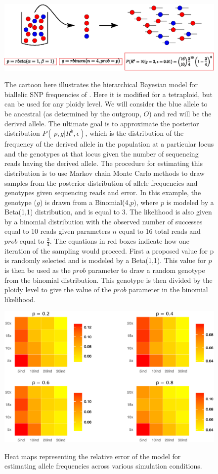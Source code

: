 \documentclass[11pt,english,letterpaper,oneside]{article}
\begin{document}
\begin{figure}[b]
\centering
\caption{The cartoon here illustrates the hierarchical Bayesian model for biallelic SNP frequencies of \cite{buerkle2013popModels}.  Here it is modified for a tetraploid, but can be used for any ploidy level. We will consider the blue allele to be ancestral (as determined by the outgroup, $O$) and red will be the derived allele. The ultimate goal is to approximate the posterior distribution $P(\,p,g|R^b,\epsilon)$, which is the distribution of the frequency of the derived allele in the population at a particular locus and the genotypes at that locus given the number of sequencing reads having the derived allele. The procedure for estimating this distribution is to use Markov chain Monte Carlo methods to draw samples from the posterior distribution of allele frequencies and genotypes given sequencing reads and error. In this example, the genotype ($g$) is drawn from a Binomial(4,$p$), where $p$ is modeled by a Beta(1,1) distribution, and is equal to 3. The likelihood is also given by a binomial distribution with the observed number of successes equal to 10 reads given parameters $n$ equal to 16 total reads and $prob$ equal to $\frac{3}{4}$. The equations in red boxes indicate how one iteration of the sampling would proceed. First a proposed value for p is randomly selected and is modeled by a Beta(1,1). This value for $p$ is then be used as the $prob$ parameter to draw a random genotype from the binomial distribution. This genotype is then divided by the ploidy level to give the value of the $prob$ parameter in the binomial likelihood.}
\vspace{0.5in}
\includegraphics[width=\textwidth]{pop-gen-model}
\smallskip
\label{fig1}
\end{figure}

\begin{figure}[b]
\centering
\caption{Heat maps representing the relative error of the model for estimating allele frequencies across various simulation conditions.}
\vspace{0.5in}
\includegraphics[width=\textwidth]{tetra-heatmaps}
\smallskip
\label{fig2}
\end{figure}
\end{document}

